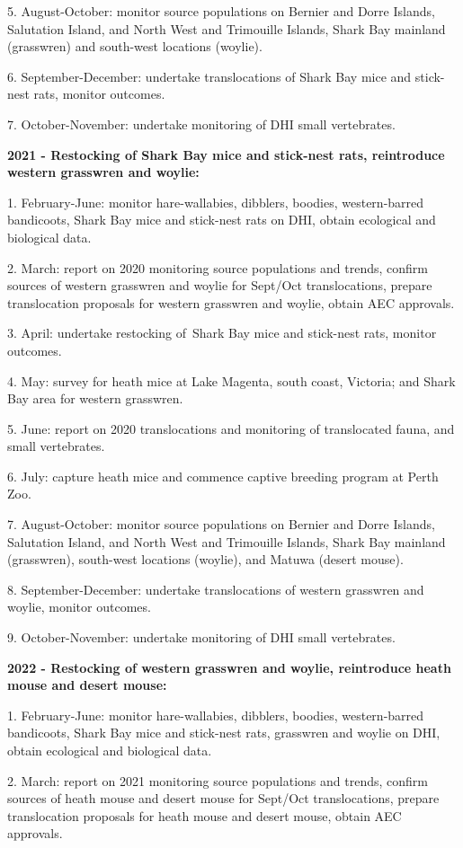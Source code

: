 \documentclass[version=last,
    paper=a4,                               %
    10pt,                                   %
    dvipsnames,
    oneside,                              %
    headings=openany,                       %
    open=any,
    BCOR=7mm,                               %
    DIV=15,     %
]{scrbook}
\begin{document}
5. August-October: monitor source populations on Bernier and Dorre
Islands, Salutation Island, and North West and Trimouille Islands, Shark
Bay mainland (grasswren) and south-west locations (woylie).

6. September-December: undertake translocations of Shark Bay mice and
stick-nest rats, monitor outcomes.

7. October-November: undertake monitoring of DHI small vertebrates.

\textbf{2021 - Restocking of Shark Bay mice and stick-nest rats,
reintroduce western grasswren and woylie:}

1. February-June: monitor hare-wallabies, dibblers, boodies,
western-barred bandicoots, Shark Bay mice and stick-nest rats on DHI,
obtain ecological and biological data.

2. March: report on 2020 monitoring source populations and trends,
confirm sources of western grasswren and woylie for Sept/Oct
translocations, prepare translocation proposals for western grasswren
and woylie, obtain AEC approvals.

3. April: undertake restocking of~Shark Bay mice and stick-nest rats,
monitor outcomes.

4. May: survey for heath mice at Lake Magenta, south coast, Victoria;
and Shark Bay area for western grasswren.

5. June: report on 2020 translocations and monitoring of translocated
fauna, and small vertebrates.

6. July: capture heath mice and commence captive breeding program at
Perth Zoo.

7. August-October: monitor source populations on Bernier and Dorre
Islands, Salutation Island, and North West and Trimouille Islands, Shark
Bay mainland (grasswren), south-west locations (woylie), and Matuwa
(desert mouse).

8. September-December: undertake translocations of western grasswren and
woylie, monitor outcomes.

9. October-November: undertake monitoring of DHI small vertebrates.

\textbf{2022 - Restocking of western grasswren and woylie, reintroduce
heath mouse and desert mouse:}

1. February-June: monitor hare-wallabies, dibblers, boodies,
western-barred bandicoots, Shark Bay mice and stick-nest rats, grasswren
and woylie on DHI, obtain ecological and biological data.

2. March: report on 2021 monitoring source populations and trends,
confirm sources of heath mouse and desert mouse for Sept/Oct
translocations, prepare translocation proposals for heath mouse and
desert mouse, obtain AEC approvals.
\end{document}
